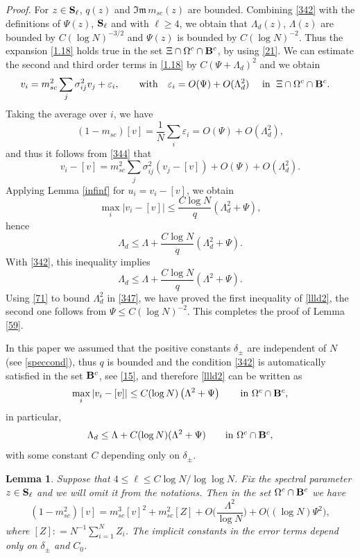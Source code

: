 \documentclass[draft]{article}
\newcommand{\e}{\varepsilon}
\newcommand{\be}{\begin{equation}}
\newcommand{\ee}{\end{equation}}
\newcommand{\barv}{ {[ v ]}}
\newcommand{\barZ}{ {[ Z ]}}
\newcommand{\im}{{\mathfrak{Im} \, }}
\newcommand{\bS}{ {\bf  S}}
\newtheorem{lemma}[theorem]{Lemma}
\newcommand{\qed}{\hfill\fbox{}\par\vspace{0.3mm}}
\numberwithin{equation}{section}
\numberwithin{theorem}{section}
\numberwithin{definition}{section}
\numberwithin{remark}{section}
\begin{document}
\medskip

{\it Proof.}  For $z\in \bS_\ell$, $q(z)$ and $\im m_{sc}(z)$ are bounded.
Combining \eqref{342} with the definitions of $\Psi(z)$, $\bS_\ell$ and with $\ell \geq 4$, we obtain  
that $\Lambda_d(z)$, $\Lambda(z)$ are bounded by $C(\log N)^{-3/2}$
and $\Psi(z)$  is bounded by $C(\log N)^{-2}$.
Thus the expansion \eqref{1.18} holds true in the set $\Xi\cap\Omega^c\cap {\bf B}^c$,
by using \eqref{21}. We can estimate
the second and third order terms in \eqref{1.18} by $C(\Psi+\Lambda_d)^2$
and we obtain
\begin{align}\label{344}
v_i & =  m_{sc}^2 \sum_{j}\sigma^2_{ij}v_j+ \e_i, \qquad
\mbox{with} \quad     
\e_i= O(\Psi) + O(\Lambda_d^2) \quad \text { in  } \; \Xi\cap\Omega^c \cap {\bf B}^c .
\end{align}
Taking the average over $i$, we have
$$
 (1-m_{sc})\barv = \frac{1}{N}\sum_i \e_i =  O(\Psi) + O(\Lambda_d^2),
$$
and thus it follows from \eqref{344} that
$$
    v_i - \barv = m_{sc}^2\sum_j \sigma^2_{ij} (v_j -\barv ) + O(\Psi) + O(\Lambda_d^2).
$$
 Applying Lemma \ref{infinf} for $u_i=v_i-\barv$, we obtain 
\be\label{347}
\max_i\left|v_i-\barv\right|\leq \frac{C \log N}{q} \left(\Lambda_d^2 +       \Psi\right) ,
\ee
hence
$$
   \Lambda_d \le \Lambda + \frac{C \log N}{q} \left(\Lambda_d^2 +       \Psi\right).
$$
With \eqref{342}, this inequality implies 
\be\label{71}
\Lambda_d\leq \Lambda + \frac{C \log N}{q} (\Lambda^2+\Psi).
\ee
Using \eqref{71} to bound $\Lambda_d^2$ in \eqref{347},  we have  proved  the
first inequality of \eqref {llld2}, the second one follows from $\Psi\le C(\log N)^{-2}$. 
This completes the proof of Lemma \ref{59}. \qed

\medskip

In this paper we assumed that the positive constants $\delta_\pm$ are independent
of $N$ (see \eqref{speccond}), thus $q$ is bounded and the  condition
\eqref{342} is automatically satisfied in the set ${\bf B}^c$, see \eqref{15}, 
and  therefore \eqref{llld2} can be written as
\be\label{llld}
\max_i\left|v_i-\barv\right|\leq C(\log N) \left(\Lambda^2 +       \Psi\right) 
 \qquad \mbox{in $\Omega^c \cap {\bf B}^c$},
\ee
in particular,
\be\label{71d}
\Lambda_d\leq \Lambda + C (\log N) (\Lambda^2+\Psi) \qquad \mbox{in $\Omega^c \cap {\bf B}^c$},
\ee
with some constant $C$ depending only on $\delta_\pm$.



\medskip 


\begin{lemma}\label{591}     Suppose that $4\le \ell\le C\log N/\log\log N$.
  Fix  the spectral parameter $z\in \bS_\ell$ and
 we will omit it from the notations.
Then in the set $\Omega^c \cap {\bf B}^c$  we have 
\be\label{661}
(1- m^2_{sc}) \barv =  m_{sc}^3 {\barv}^2+  m^2_{sc}\barZ   
 +  O\Big( \frac{\Lambda^2}{\log N}\Big)+   O\Big( (\log N)\Psi^2 \Big),
\ee
where $\barZ: = N^{-1} \sum_{i=1}^N Z_i$. The implicit constants in 
the error terms depend only on $\delta_\pm$ and $C_0$.
\end{lemma}
\end{document}
